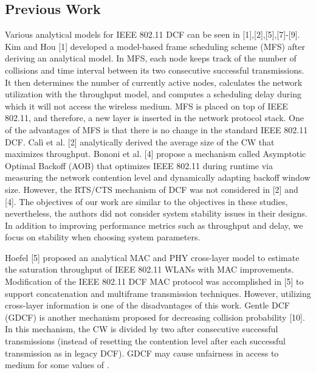 \documentclass[10pt,twocolumn,oneside,submit]{JCNtran}
\begin{document}
\subsection{Previous Work}
Various analytical models for IEEE 802.11 DCF can be seen in [1],[2],[5],[7]-[9]. Kim and Hou [1] developed a model-based frame scheduling scheme (MFS) after deriving an analytical model. In MFS, each node keeps track of the number of collisions and time interval between its two consecutive successful transmissions. It then determines the number of currently active nodes, calculates the network utilization with the throughput model, and computes a scheduling delay during which it will not access the wireless medium. MFS is placed on top of IEEE 802.11, and therefore, a new layer is inserted in the network protocol stack. One of the advantages of MFS is that there is no change in the standard IEEE 802.11 DCF. Cal{\`i} et al. [2] analytically derived the average size of the CW that maximizes throughput. Bononi et al. [4] propose a mechanism called Asymptotic Optimal Backoff (AOB) that optimizes IEEE 802.11 during runtime via measuring the network contention level and dynamically adapting backoff window size. However, the RTS/CTS mechanism of DCF was not considered in [2] and [4]. The objectives of our work are similar to the objectives in these studies, nevertheless, the authors did not consider system stability issues in their designs. In addition to improving performance metrics such as throughput and delay, we focus on stability when choosing system parameters.

Hoefel [5] proposed an analytical MAC and PHY cross-layer model to estimate the saturation throughput of IEEE 802.11 WLANs with MAC improvements. Modification of the IEEE 802.11 DCF MAC protocol was accomplished in [5] to support concatenation and multiframe transmission techniques. However, utilizing cross-layer information is one of the disadvantages of this work. Gentle DCF (GDCF) is another mechanism proposed for decreasing collision probability [10]. In this mechanism, the CW is divided by two after  consecutive successful transmissions (instead of resetting the contention level after each successful transmission as in legacy DCF). GDCF may cause unfairness in access to medium for some values of .
\end{document}
